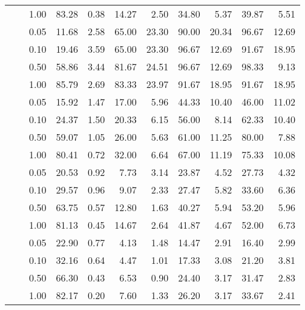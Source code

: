 \begin{table}
\begin{tabular}[t]{rrrrrrrrrrr}
\multirow{-12}{*}{\raggedleft\arraybackslash 50} & \multirow{-4}{*}{\raggedleft\arraybackslash 25} & 1.00 & 83.28 & 0.38 & 14.27 & 2.50 & 34.80 & 5.37 & 39.87 & 5.51\\
\cmidrule{1-11}
 &  & 0.05 & 11.68 & 2.58 & 65.00 & 23.30 & 90.00 & 20.34 & 96.67 & 12.69\\

 &  & 0.10 & 19.46 & 3.59 & 65.00 & 23.30 & 96.67 & 12.69 & 91.67 & 18.95\\

 &  & 0.50 & 58.86 & 3.44 & 81.67 & 24.51 & 96.67 & 12.69 & 98.33 & 9.13\\

 & \multirow{-4}{*}{\raggedleft\arraybackslash 2} & 1.00 & 85.79 & 2.69 & 83.33 & 23.97 & 91.67 & 18.95 & 91.67 & 18.95\\

\cline{2-11}
 &  & 0.05 & 15.92 & 1.47 & 17.00 & 5.96 & 44.33 & 10.40 & 46.00 & 11.02\\

 &  & 0.10 & 24.37 & 1.50 & 20.33 & 6.15 & 56.00 & 8.14 & 62.33 & 10.40\\

 &  & 0.50 & 59.07 & 1.05 & 26.00 & 5.63 & 61.00 & 11.25 & 80.00 & 7.88\\

 & \multirow{-4}{*}{\raggedleft\arraybackslash 10} & 1.00 & 80.41 & 0.72 & 32.00 & 6.64 & 67.00 & 11.19 & 75.33 & 10.08\\

\cline{2-11}
 &  & 0.05 & 20.53 & 0.92 & 7.73 & 3.14 & 23.87 & 4.52 & 27.73 & 4.32\\

 &  & 0.10 & 29.57 & 0.96 & 9.07 & 2.33 & 27.47 & 5.82 & 33.60 & 6.36\\

 &  & 0.50 & 63.75 & 0.57 & 12.80 & 1.63 & 40.27 & 5.94 & 53.20 & 5.96\\

 & \multirow{-4}{*}{\raggedleft\arraybackslash 25} & 1.00 & 81.13 & 0.45 & 14.67 & 2.64 & 41.87 & 4.67 & 52.00 & 6.73\\

 &  & 0.05 & 22.90 & 0.77 & 4.13 & 1.48 & 14.47 & 2.91 & 16.40 & 2.99\\

 &  & 0.10 & 32.16 & 0.64 & 4.47 & 1.01 & 17.33 & 3.08 & 21.20 & 3.81\\

 &  & 0.50 & 66.30 & 0.43 & 6.53 & 0.90 & 24.40 & 3.17 & 31.47 & 2.83\\

\multirow{-16}{*}{\raggedleft\arraybackslash 100} & \multirow{-4}{*}{\raggedleft\arraybackslash 50} & 1.00 & 82.17 & 0.20 & 7.60 & 1.33 & 26.20 & 3.17 & 33.67 & 2.41\\
\bottomrule
\end{tabular}
\end{table}
